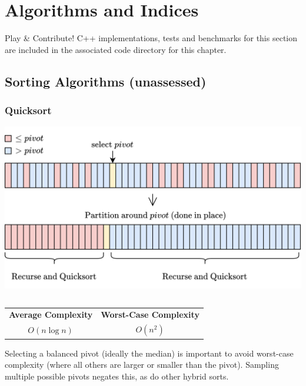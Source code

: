 \chapter{Algorithms and Indices}
\begin{sidenotebox}{Play \& Contribute!}
    C++ implementations, tests and benchmarks for this section are included in the associated code directory for this chapter.
\end{sidenotebox}

\section{Sorting Algorithms (unassessed)}

\subsection{Quicksort}
\begin{center}
    \includegraphics[width=.9\textwidth]{algorithms_and_indices/images/quicksort.drawio.png}
\end{center}
\inputminted{cpp}{algorithms_and_indices/code/sort_comparison/sorts/quicksort.h}
\begin{center}
    \begin{tabular}{c | c}
        \textbf{Average Complexity} & \textbf{Worst-Case Complexity} \\
        $O(n \log n)$               & $O(n^2)$                       \\
    \end{tabular}
\end{center}
Selecting a balanced pivot (ideally the median) is important to avoid worst-case complexity (where all others are larger or smaller than the pivot). Sampling multiple possible pivots negates this, as do other hybrid sorts.

